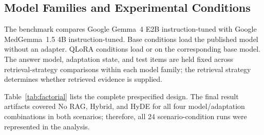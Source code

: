 \subsection{Model Families and Experimental Conditions}
The benchmark compares Google Gemma~4 E2B instruction-tuned with Google
MedGemma~1.5 4B instruction-tuned. Base conditions load the published
model without an adapter. QLoRA conditions load
 or
 on the corresponding base
model. The answer model, adaptation state, and test items are held fixed across
retrieval-strategy comparisons within each model family; the retrieval
strategy determines whether retrieved evidence is supplied.

Table~\ref{tab:factorial} lists the complete prespecified design. The final
result artifacts covered No RAG, Hybrid, and HyDE for all four
model/adaptation combinations in both scenarios; therefore, all 24
scenario-condition runs were represented in the analysis.

